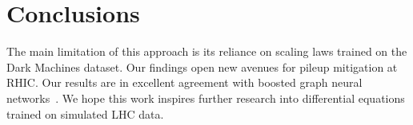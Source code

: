 \section{Conclusions}\label{sec:conclusions}

The main limitation of this approach is its reliance on scaling laws
trained on the Dark Machines dataset. Our findings open new avenues for
pileup mitigation at RHIC. Our results are in excellent agreement with
boosted graph neural
networks~\cite{TPC:1985-Projected-Energy-Correlators-from-Generative-Diffusion-Models-September-27-2026}.
We hope this work inspires further research into differential equations
trained on simulated LHC data.

